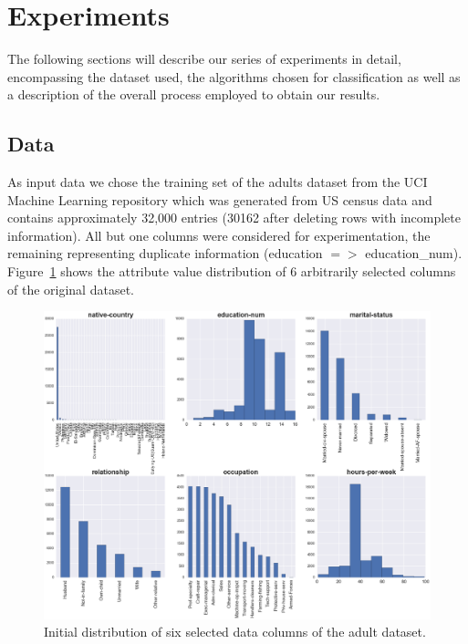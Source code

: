 \documentclass{llncs}
\begin{document}
\section{Experiments}
\label{sect:experiments}

The following sections will describe our series of experiments in detail, encompassing the dataset used, the algorithms chosen for classification as well as a description of the overall process employed to obtain our results.


\subsection{Data} 
\label{ssect:data}

As input data we chose the training set of the adults dataset from the UCI Machine Learning repository which was generated from US census data and contains approximately 32,000 entries (30162 after deleting rows with incomplete information). All but one columns were considered for experimentation, the remaining representing duplicate information (education $=>$ education\_num). Figure~\ref{fig:adult_original_distribution} shows the attribute value distribution of 6 arbitrarily selected columns of the original dataset.


\begin{figure}[H]
	\begin{center}
    \hspace*{-0.8cm}
		\includegraphics[width=1.1\textwidth]{figures/theory/dist_initial_small}
		\caption{Initial distribution of six selected data columns of the adult dataset.}
		\label{fig:adult_original_distribution}
	\end{center}
\end{figure}
\end{document}
